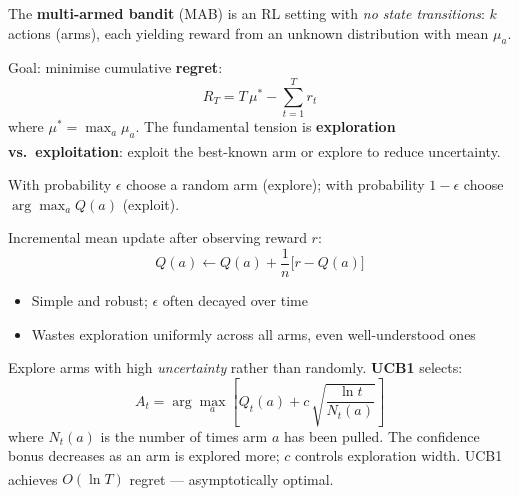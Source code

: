     \begin{tcbitemize}[ skin=sectionraster ]

        \tcbitem[title={The Multi-Armed Bandit}, raster multicolumn=3]
        The \textbf{multi-armed bandit} (MAB) is an RL setting with
        \emph{no state transitions}: $k$ actions (arms), each yielding reward
        from an unknown distribution with mean $\mu_a$.

        Goal: minimise cumulative \textbf{regret}:
        \begin{equation}
            R_T = T\,\mu^* - \sum_{t=1}^{T} r_t
        \end{equation}
        where $\mu^* = \max_a \mu_a$.
        The fundamental tension is \textbf{exploration vs.\ exploitation}:
        exploit the best-known arm or explore to reduce
        uncertainty.\textsuperscript{\cite[][p.~335]{hurbansGrokkingArtificialIntelligence2020}}

        \tcbitem[title={$\epsilon$-Greedy Strategy}, raster multicolumn=3]
        With probability $\epsilon$ choose a random arm (explore); with
        probability $1 - \epsilon$ choose $\arg\max_a Q(a)$ (exploit).

        Incremental mean update after observing reward $r$:
        \begin{equation}
            Q(a) \leftarrow Q(a) + \frac{1}{n}\bigl[r - Q(a)\bigr]
        \end{equation}
        \begin{itemize}
            \item Simple and robust; $\epsilon$ often decayed over time
            \item Wastes exploration uniformly across all arms, even
                  well-understood ones
        \end{itemize}
        \textsuperscript{\cite[][p.~336]{hurbansGrokkingArtificialIntelligence2020}}

        \tcbitem[title={Upper Confidence Bound (UCB)}, raster multicolumn=3]
        Explore arms with high \emph{uncertainty} rather than randomly.
        \textbf{UCB1} selects:
        \begin{equation}
            A_t = \arg\max_a \left[Q_t(a) + c\,\sqrt{\frac{\ln t}{N_t(a)}}\right]
        \end{equation}
        where $N_t(a)$ is the number of times arm $a$ has been pulled.
        The confidence bonus decreases as an arm is explored more; $c$
        controls exploration width.
        UCB1 achieves $O(\ln T)$ regret --- asymptotically
        optimal.\textsuperscript{\cite[][p.~337]{hurbansGrokkingArtificialIntelligence2020}}


\end{tcbitemize}

